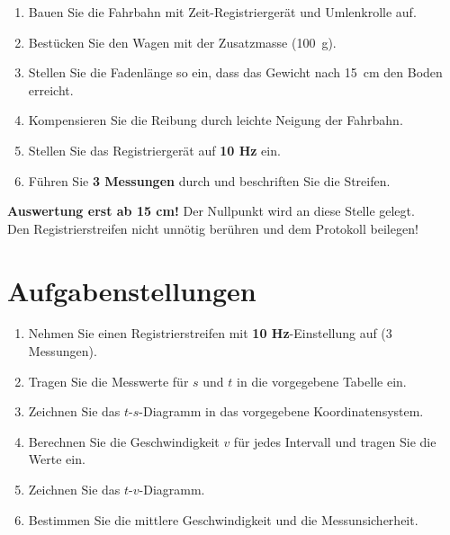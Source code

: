 \documentclass[11pt,a4paper]{scrartcl}
\begin{document}
	\begin{enumerate}
		\item Bauen Sie die Fahrbahn mit Zeit-Registriergerät und Umlenkrolle auf.
		\item Bestücken Sie den Wagen mit der Zusatzmasse (\SI{100}{\gram}).
		\item Stellen Sie die Fadenlänge so ein, dass das Gewicht nach \SI{15}{cm} den Boden erreicht.
		\item Kompensieren Sie die Reibung durch leichte Neigung der Fahrbahn.
		\item Stellen Sie das Registriergerät auf \textbf{10 Hz} ein.
		\item Führen Sie \textbf{3 Messungen} durch und beschriften Sie die Streifen.
	\end{enumerate}
	
	\begin{hilfebox}[title={\faIcon{lightbulb} Wichtig}]
		\textbf{Auswertung erst ab 15 cm!} Der Nullpunkt wird an diese Stelle gelegt.\\
		Den Registrierstreifen nicht unnötig berühren und dem Protokoll beilegen!
	\end{hilfebox}
	
	\section*{Aufgabenstellungen}
	
	\begin{aufgabe}[title={\faIcon{pencil-alt} Aufgaben}]
		\begin{enumerate}
			\item Nehmen Sie einen Registrierstreifen mit \textbf{10 Hz}-Einstellung auf (3 Messungen).
			\item Tragen Sie die Messwerte für $s$ und $t$ in die vorgegebene Tabelle ein.
			\item Zeichnen Sie das $t$-$s$-Diagramm in das vorgegebene Koordinatensystem.
			\item Berechnen Sie die Geschwindigkeit $v$ für jedes Intervall und tragen Sie die Werte ein.
			\item Zeichnen Sie das $t$-$v$-Diagramm.
			\item Bestimmen Sie die mittlere Geschwindigkeit und die Messunsicherheit.
		\end{enumerate}
	\end{aufgabe}
	
\end{document}
